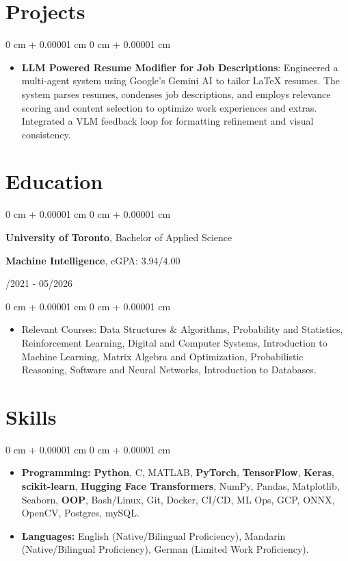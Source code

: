 \documentclass[10pt, letterpaper]{article}
\newenvironment{highlights}{
    \begin{itemize}[
        topsep=0.10 cm,
        parsep=0.10 cm,
        partopsep=0pt,
        itemsep=0pt,
        leftmargin=0 cm + 10pt
    ]
}{
    \end{itemize}
}
\newenvironment{onecolentry}{
    \begin{adjustwidth}{
        0 cm + 0.00001 cm
    }{
        0 cm + 0.00001 cm
    }
}{
    \end{adjustwidth}
}
\newenvironment{twocolentry}[2][]{
    \onecolentry
    \def\secondColumn{#2}
    \setcolumnwidth{\fill, 4.5 cm}
    \begin{paracol}{2}
}{
    \switchcolumn \raggedleft \secondColumn
    \end{paracol}
    \endonecolentry
}
\begin{document}
\section{Projects}
\vspace{0.10 cm}
\begin{onecolentry}
    \begin{highlights}
        \item \textbf{LLM Powered Resume Modifier for Job Descriptions}: Engineered a multi-agent system using Google's Gemini AI to tailor LaTeX resumes. The system parses resumes, condenses job descriptions, and employs relevance scoring and content selection to optimize work experiences and extras. Integrated a VLM feedback loop for formatting refinement and visual consistency.
    \end{highlights}
\end{onecolentry}

\section{Education}
\vspace{0.08 cm}
\begin{twocolentry}{09/2021 - 05/2026}
    {\textbf{University of Toronto}}, Bachelor of Applied Science  
    \item \textbf{Machine Intelligence}, cGPA: {3.94}/4.00
\end{twocolentry}
\vspace{0.10 cm}
\begin{onecolentry}
    \begin{highlights}
        \item Relevant Courses: Data Structures \& Algorithms, Probability and Statistics, Reinforcement Learning, Digital and Computer Systems, Introduction to Machine Learning, Matrix Algebra and Optimization, Probabilistic Reasoning, Software and Neural Networks, Introduction to Databases.
    \end{highlights}
\end{onecolentry}

\section{Skills}
\begin{onecolentry}
    \begin{highlights}
        \item \textbf{Programming:} \textbf{Python}, C, MATLAB, \textbf{PyTorch}, \textbf{TensorFlow}, \textbf{Keras}, \textbf{scikit-learn}, \textbf{Hugging Face Transformers}, NumPy, Pandas, Matplotlib, Seaborn, \textbf{OOP}, Bash/Linux, Git, Docker, CI/CD, ML Ops, GCP, ONNX, OpenCV, Postgres, mySQL.

        \item \textbf{Languages:} English (Native/Bilingual Proficiency), Mandarin (Native/Bilingual Proficiency), German (Limited Work Proficiency).
    \end{highlights}
\end{onecolentry}
\end{document}
